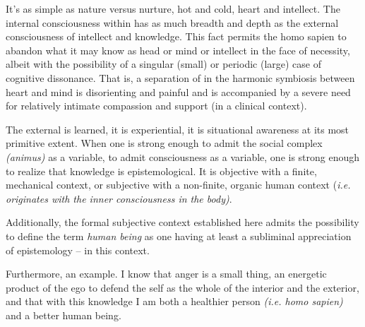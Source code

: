 

It's as simple as nature versus nurture, hot and cold, heart and
intellect.  The internal consciousness within has as much breadth and
depth as the external consciousness of intellect and knowledge.  This
fact permits the homo sapien to abandon what it may know as head or
mind or intellect in the face of necessity, albeit with the
possibility of a singular (small) or periodic (large) case of
cognitive dissonance.  That is, a separation of in the harmonic
symbiosis between heart and mind is disorienting and painful and is
accompanied by a severe need for relatively intimate compassion and
support (in a clinical context).

The external is learned, it is experiential, it is situational
awareness at its most primitive extent.  When one is strong enough to
admit the social complex {\it (animus)} as a variable, to admit
consciousness as a variable, one is strong enough to realize that
knowledge is epistemological.  It is objective with a finite,
mechanical context, or subjective with a non-finite, organic human
context {(\it i.e. originates with the inner consciousness in the
body)}.

Additionally, the formal subjective context established here admits
the possibility to define the term {\it human being} as one having at
least a subliminal appreciation of epistemology -- in this context.

Furthermore, an example.  I know that anger is a small thing, an
energetic product of the ego to defend the self as the whole of the
interior and the exterior, and that with this knowledge I am both a
healthier person {\it (i.e. homo sapien)} and a better human being.

\bye
